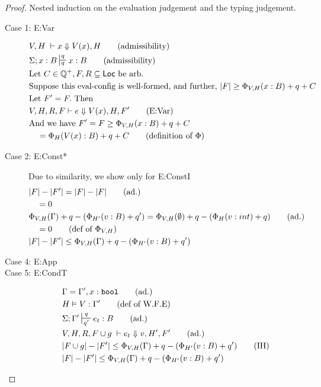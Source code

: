 \documentclass[11pt]{article}
\newcommand{\ms}[1]{\ensuremath{\mathsf{#1}}}
\newcommand{\irl}[1]{\mathtt{#1}}
\theoremstyle{definition}
\begin{document}
\begin{proof}
Nested induction on the evaluation judgement and the typing judgement.\\
\begin{description}
  \item[Case 1: E:Var]
  \begin{align*}
  &V,H \; \vdash x \Downarrow V(x),H \tag{admissibility}\\
  &\Sigma; x : B \sststile{q}{q} x : B \tag{admissibility}\\
	&\text{Let } C \in \mathbb{Q}^+, F,R \subseteq \ms{Loc} \text{ be arb.}\\
	&\text{Suppose this eval-config is well-formed, and further, } |F| \ge \Phi_{V,H}(x : B) + q + C\\
	&\text{Let } F' = F. \text{ Then }\\
	&V,H,R,F \vdash e \Downarrow V(x),H,F' \tag{E:Var}\\
	&\text{And we have } F' = F \ge \Phi_{V,H}(x : B) + q + C\\
	&\quad = \Phi_{H}(V(x) : B) + q + C \tag{definition of $\Phi$}\\
  \end{align*}
  \item[Case 2: E:Const*]
  Due to similarity, we show only for E:ConstI
  \begin{align*}
  &|F| - |F'| = |F| - |F| \tag{ad.}\\
  &\quad = 0\\
  &\Phi_{V,H}(\Gamma) +q - (\Phi_{H'}(v:B) + q') = \Phi_{V,H}(\emptyset) +q - (\Phi_{H}(v:int) + q) \tag{ad.}\\
  &\quad = 0 \tag{def of $\Phi_{V,H}$}\\
  &|F| - |F'| \le \Phi_{V,H}(\Gamma) +q - (\Phi_{H'}(v:B) + q')
  \end{align*}
  \item[Case 4: E:App]
  \item[Case 5: E:CondT]
  \begin{align*}
  &\Gamma = \Gamma', x : \irl{bool} \tag{ad.}\\
  &H \vDash V : \Gamma' \tag{def of W.F.E}\\
  &\Sigma; \Gamma' \sststile{q'}{q} e_t : B \tag{ad.}\\
  &V,H,R,F \cup g\; \vdash e_t \Downarrow v, H',F' \tag{ad.}\\
  &|F \cup g| - |F'| \le \Phi_{V,H}(\Gamma) +q - (\Phi_{H'}(v:B) + q') \tag{IH}\\
  &|F| - |F'| \le \Phi_{V,H}(\Gamma) +q - (\Phi_{H'}(v:B) + q') \\

\end{align*}
\end{description}
\end{proof}
\end{document}
